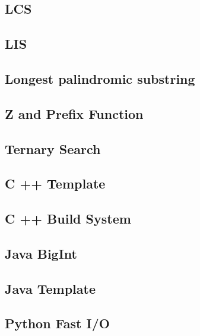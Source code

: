\documentclass[12pt]{extarticle}
\begin{document}
\begin{multicols*}{3}
\subsection{LCS} %


\subsection{LIS} %



\subsection{Longest palindromic substring} %


\subsection{Z and Prefix Function} %


\subsection{Ternary Search} %


\subsection{C ++ Template} %


\subsection{C ++ Build System} %


\subsection{Java BigInt} %


\subsection{Java Template} %


\subsection{Python Fast I/O} %



\end{multicols*}
\end{document}
